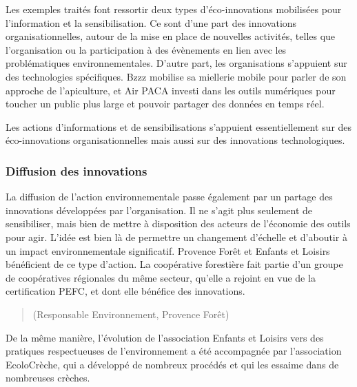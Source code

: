             Les exemples traités font ressortir deux types d'éco-innovations mobilisées pour l'information et la sensibilisation. Ce sont d'une part des innovations organisationnelles, autour de la mise en place de nouvelles activités, telles que l'organisation ou la participation à des évènements en lien avec les problématiques environnementales. D'autre part, les organisations s'appuient sur des technologies spécifiques. Bzzz mobilise sa miellerie mobile pour parler de son approche de l'apiculture, et Air PACA investi dans les outils numériques pour toucher un public plus large et pouvoir partager des données en temps réel. 
            
            \begin{hyp}
            \label{prop:F}
                Les actions d'informations et de sensibilisations  s'appuient essentiellement sur des éco-innovations organisationnelles mais aussi sur des innovations technologiques.
            \end{hyp}
            
        \subsubsection{Diffusion des innovations}
            La diffusion de l'action environnementale passe également par un partage des innovations développées par l'organisation. Il ne s'agit plus seulement de sensibiliser, mais bien de mettre à disposition des acteurs de l'économie des outils pour agir. L'idée est bien là de permettre un changement d'échelle et d'aboutir à un impact environnementale significatif. Provence Forêt et Enfants et Loisirs bénéficient de ce type d'action. La coopérative forestière fait partie d'un groupe de coopératives régionales du même secteur, qu'elle a rejoint en vue de la certification PEFC, et dont elle bénéfice des innovations.
            \begin{quotation}
                 (Responsable Environnement, Provence Forêt)
            \end{quotation}
            De la même manière, l'évolution de l'association Enfants et Loisirs vers des pratiques respectueuses de l'environnement a été accompagnée par l'association EcoloCrèche, qui a développé de nombreux procédés et qui les essaime dans de nombreuses crèches. 
            

